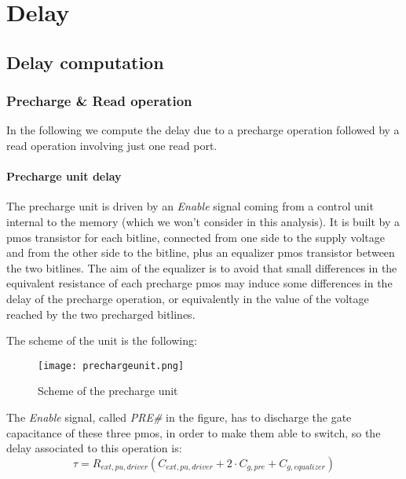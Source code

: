 \chapter{Delay}
\graphicspath{{foto/Chap2/}}

\section{Delay computation}
\subsection{Precharge \& Read operation}
In the following we compute the delay due to a precharge operation followed by a read operation involving just one read port.

\subsubsection{Precharge unit delay}
\label{sec:precharge_unit_delay}
The precharge unit is driven by an \textit{Enable} signal coming from a control unit internal to the memory (which we won't consider in this analysis). It is built by a pmos transistor for each bitline, connected from one side to the supply voltage and from the other side to the bitline, plus an equalizer pmos transistor between the two bitlines. The aim of the equalizer is to avoid that small differences in the equivalent resistance of each precharge pmos may induce some differences in the delay of the precharge operation, or equivalently in the value of the voltage reached by the two precharged bitlines. 

The scheme of the unit is the following:

\begin{center}
	\begin{figure}[H]
		\centering
		\texttt{[image: prechargeunit.png]}
		\caption{Scheme of the precharge unit}
	\end{figure}
\end{center}

The \textit{Enable} signal, called \textit{PRE\#} in the figure, has to discharge the gate capacitance of these three pmos, in order to make them able to switch, so the delay associated to this operation is:
$$\tau=R_{ext,pu,driver}(C_{ext,pu,driver}+2\cdot C_{g,pre}+C_{g,equalizer})$$\\

